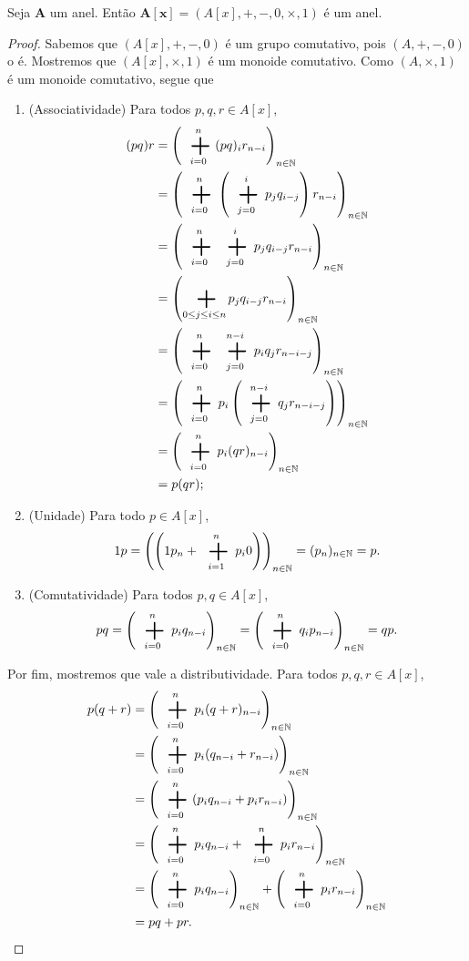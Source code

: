 \begin{proposition}
Seja $\bm A$ um anel. Então $\bm{A[x]} = (A[x],+,-,0,\times,1)$ é um anel.
\end{proposition}
\begin{proof}
Sabemos que $(A[x],+,-,0)$ é um grupo comutativo, pois $(A,+,-,0)$ o é. Mostremos que $(A[x],\times,1)$ é um monoide comutativo. Como $(A,\times,1)$ é um monoide comutativo, segue que
	\begin{enumerate}
	\item (Associatividade) Para todos $p,q,r \in A[x]$,
		\begin{align*}
		(pq)r &= \left(\sum_{i=0}^n (pq)_i r_{n-i}\right)_{n \in \N} \\
			&= \left(\sum_{i=0}^n \left(\sum_{j=0}^i p_j q_{i-j}\right) r_{n-i}\right)_{n \in \N} \\
			&= \left(\sum_{i=0}^n \sum_{j=0}^i p_j q_{i-j} r_{n-i} \right)_{n \in \N} \\
			&= \left(\sum_{0 \leq j \leq i \leq n} p_j q_{i-j} r_{n-i} \right)_{n \in \N} \\
			&= \left(\sum_{i=0}^n \sum_{j=0}^{n-i} p_i q_j r_{n-i-j} \right)_{n \in \N}\\
			&= \left(\sum_{i=0}^n p_i \left(\sum_{j=0}^{n-i} q_j r_{n-i-j}\right)\right)_{n \in \N}\\
			&= \left(\sum_{i=0}^n p_i (qr)_{n-i}\right)_{n \in \N}\\
			&= p(qr);
		\end{align*}
	\item (Unidade) Para todo $p \in A[x]$,
		\begin{equation*}
		1p = \left(\left(1p_n + \sum_{i=1}^{n} p_i 0 \right)\right)_{n \in \N} = (p_n)_{n \in \N} = p.
		\end{equation*}
	\item (Comutatividade) Para todos $p,q \in A[x]$,
		\begin{equation*}
		pq = \left(\sum_{i=0}^n p_i q_{n-i}\right)_{n \in \N} = \left(\sum_{i=0}^n q_i p_{n-i}\right)_{n \in \N} = qp.
		\end{equation*}
	\end{enumerate}
Por fim, mostremos que vale a distributividade. Para todos $p,q,r \in A[x]$,
	\begin{align*}
	p (q + r) &= \left(\sum_{i=0}^n p_i (q+r)_{n-i}\right)_{n \in \N} \\
		&=  \left(\sum_{i=0}^n p_i (q_{n-i}+r_{n-i})\right)_{n \in \N} \\
		&=  \left(\sum_{i=0}^n (p_i q_{n-i} + p_i r_{n-i})\right)_{n \in \N} \\
		&=  \left(\sum_{i=0}^n p_i q_{n-i} + \sum_{i=0}^n p_i r_{n-i}\right)_{n \in \N} \\
		&= \left(\sum_{i=0}^n p_i q_{n-i}\right)_{n \in \N} + \left(\sum_{i=0}^n p_i r_{n-i}\right)_{n \in \N} \\
		&= pq+pr.
	\end{align*}	
\end{proof}

